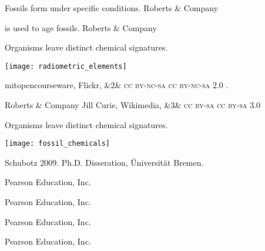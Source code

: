 \documentclass[t]{beamer}
\newcommand{\ccbysa}[1]{%
	\ifx&#1&
	{\textsc{cc by-sa}}%
\else
	{\textsc{cc by-sa #1.0}} 
\fi}
\newcommand{\ccbyncsa}[1]{%
	\ifx&#1&
	{\textsc{cc by-nc-sa}}%
\else
	{\textsc{cc by-nc-sa #1.0}}
\fi}
\begin{document}
%
{
\begin{frame}[b]{Fossils form under specific conditions.}
\hfill \tiny \textcopyright Roberts \& Company
\end{frame}
}
%
{
\begin{frame}[b]{ is used to age fossils.}
\hfill \tiny \textcopyright Roberts \& Company
\end{frame}
}
%
\begin{frame}[t]{Organisms leave distinct chemical signatures.}

	\texttt{[image: radiometric\_elements]}

	\vfilll
	
	\hfill \tiny mitopencourseware, Flickr, \ccbyncsa{2}.

\end{frame}
%
{
\begin{frame}[b]
\tiny \textcopyright Roberts \& Company \hfill Jill Curie, Wikimedia, \ccbysa{3} 
\end{frame}
}
%
\begin{frame}[t]{Organisms leave distinct chemical signatures.}

	\texttt{[image: fossil\_chemicals]}

	\vfilll
	
	\hfill \tiny Schubotz 2009. Ph.D. Disseration, Üniversität Bremen.

\end{frame}
%
{
\begin{frame}[b]
\hfill \tiny \textcopyright Pearson Education, Inc.
\end{frame}
}
%
{
\begin{frame}[b]
\hfill \tiny \textcopyright Pearson Education, Inc.
\end{frame}
}
%
{
\begin{frame}[b]
\hfill \tiny \textcopyright Pearson Education, Inc.
\end{frame}
}
%
{
\begin{frame}[b]
\hfill \tiny \textcopyright Pearson Education, Inc.
\end{frame}
}
\end{document}
